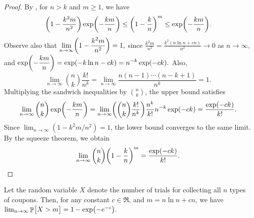\begin{proof}
    By , for $n > k$ and $m \geq 1$, we have
    \begin{equation*}
        \pth{ 1- \frac{k^2 m}{n^2}} \exp \pth[]{ -\frac{km}{n}}%
        \leq%
        \pth[]{ 1- \frac{k}{n}}^m%
        \leq%
        \exp \pth[]{ -\frac{km}{n}}.        
    \end{equation*}
    Observe also that
    \begin{math}
        \ds \lim_{n\rightarrow \infty} \pth[]{1-\frac{k^2m}{n^2}} = 1,
    \end{math}
    since $\frac{k^2 m}{n^2} = \frac{k^2(n \ln n + cn)}{n^2} \to 0$ as $n \to \infty$,
    and 
    \begin{math}
        \ds \exp \pth[]{-\frac{km}{n}} = \exp\pth{-k\ln n - ck} = n^{-k}\exp \pth{-ck}.
    \end{math}
    Also,
    \begin{equation*}
        \lim_{n\rightarrow \infty} \binom{n}{k} \frac{k!}{n^k}%
        =%
        \lim_{n\rightarrow \infty} \frac{n(n-1)\cdots (n-k+1)}{n^k}%
        =%
        1.        
    \end{equation*}
    Multiplying the sandwich inequalities by $\binom{n}{k}$, the upper bound satisfies
    \begin{equation*}
        \lim_{n\rightarrow \infty} \binom{n}{k} \exp\pth[]{ -\frac{km}{n} }%
        =%
        \lim_{n\rightarrow \infty} \pth[]{ \binom{n}{k} \frac{k!}{n^k} } \frac{n^k}{k!} n^{-k} \exp(-ck)%
        =%
        \frac{\exp(-ck)}{k!}.
    \end{equation*}
    Since $\lim_{n \to \infty} (1 - k^2m/n^2) = 1$, the lower bound converges to the same limit.
    By the squeeze theorem, we obtain
    \begin{equation*}
        \lim_{n\rightarrow \infty} {\binom{n}{k} } \pth[]{ 1-
           \frac{k}{n} }^m%
        =%
        \frac{\exp(-ck)}{k!}.
    \end{equation*}
\end{proof}



\begin{theorem}
    Let the random variable $X$ denote the number of trials for
    collecting all $n$ types of coupons. Then, for any
    constant $c \in \Re$, and $m = n\ln n + c n$, we have
    \begin{math}
        \lim_{n\rightarrow \infty} \Prob{\bigl. X > m} = 1 -\exp
        \pth{\bigl. -e^{-c}}.
    \end{math}
\end{theorem}



